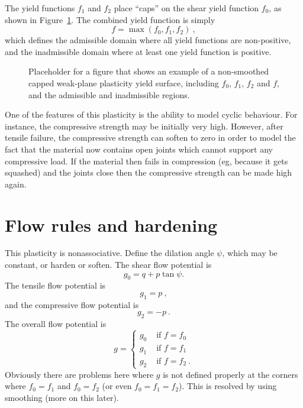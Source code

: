 \documentclass[]{scrreprt}
\begin{document}
The yield functions $f_{1}$ and $f_{2}$ place ``caps'' on the shear
yield function $f_{0}$, as shown in Figure~\ref{no_smoothing_eg.fig}.
The combined yield function is simply
\begin{equation}
f = \max(f_{0}, f_{1}, f_{2}) \ ,
\label{one.yf.eqn}
\end{equation}
which defines the admissible domain where all yield functions are
non-positive, and the inadmissible domain where at least one yield
function is positive.

\begin{figure}[htb]
\begin{center}
\caption{Placeholder for a figure that shows an example of a
  non-smoothed capped weak-plane plasticity yield surface, including
  $f_{0}$, $f_{1}$, $f_{2}$ and $f$, and the admissible and
  inadmissible regions.}
\label{no_smoothing_eg.fig}
\end{center}
\end{figure}

One of the features of this plasticity is the
ability to model cyclic behaviour.  For instance, the compressive
strength may be initially very high.  However, after tensile failure,
the compressive strength can soften to zero in order to model the fact
that the material now contains open joints which cannot support any
compressive load.  If the material then fails in compression (eg,
because it gets squashed) and the joints close then the compressive
strength can be made high again.

\chapter{Flow rules and hardening}

This plasticity is nonassociative.  Define the dilation angle $\psi$,
which may be constant, or harden or soften.  The shear flow potential
is
\begin{equation}
g_{0} = q + p\tan\psi .
\end{equation}
The tensile flow potential is
\begin{equation}
g_{1} = p \ ,
\end{equation}
and the compressive flow potential is
\begin{equation}
g_{2} = - p \ .
\end{equation}
The overall flow potential is
\begin{equation}
g = \left\{
\begin{array}{ll}
g_{0} & \mbox{ if } f = f_{0} \\
g_{1} & \mbox{ if } f = f_{1} \\
g_{2} & \mbox{ if } f = f_{2}\ .
\end{array}
\label{one.g.eqn}
\right.
\end{equation}
Obviously there are problems here where $g$ is not defined properly at
the corners where $f_{0}=f_{1}$ and $f_{0}=f_{2}$ (or even
$f_{0}=f_{1}=f_{2}$).  This is resolved by using smoothing (more on
this later).
\end{document}
